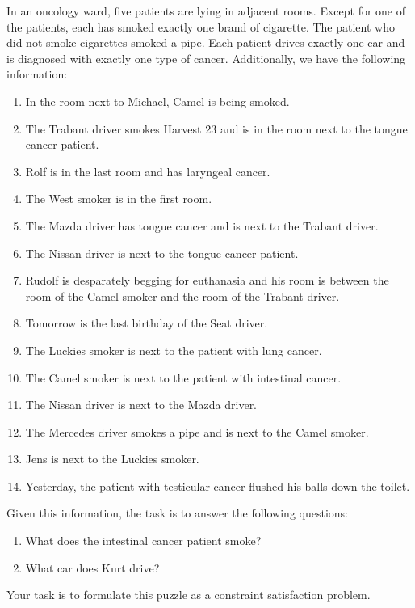 \exercise
In an oncology ward, five patients are lying in adjacent rooms. Except for one of the patients, each has smoked
exactly one brand of cigarette. The patient who did not smoke cigarettes smoked a pipe. Each patient drives
exactly one car and is diagnosed with exactly one type of cancer. Additionally, we have the following
information: 
\begin{enumerate}
\item In the room next to Michael, Camel is being smoked.
\item The Trabant driver smokes Harvest 23 and is in the room next to the tongue cancer patient.
\item Rolf is in the last room and has laryngeal cancer.
\item The West smoker is in the first room.
\item The Mazda driver has tongue cancer and is next to the Trabant driver.
\item The Nissan driver is next to the tongue cancer patient.
\item Rudolf is desparately begging for euthanasia and his room is between the room of the Camel smoker and the
      room of the Trabant driver.
\item Tomorrow is the last birthday of the Seat driver.
\item The Luckies smoker is next to the patient with lung cancer.
\item The Camel smoker is next to the patient with intestinal cancer.
\item The Nissan driver is next to the Mazda driver.
\item The Mercedes driver smokes a pipe and is next to the Camel smoker.
\item Jens is next to the Luckies smoker.
\item Yesterday, the patient with testicular cancer flushed his balls down the toilet.
\end{enumerate}
Given this information, the task is to answer the following questions:
\begin{enumerate}
\item What does the intestinal cancer patient smoke?
\item What car does Kurt drive?
\end{enumerate}
Your task is to formulate this puzzle as a constraint satisfaction problem. \eox

